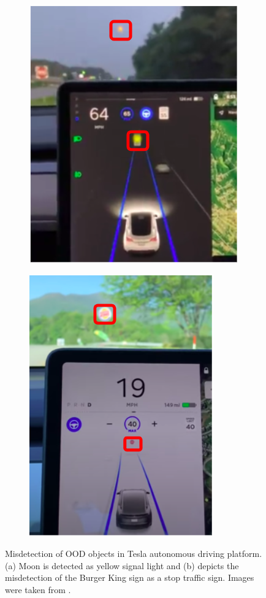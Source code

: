 \begin{figure}[h!]
    \begin{subfigure}{0.48\textwidth}
        \centering
        \includegraphics[scale=0.5]{images/tesla_1.png}
        \caption{}
        \label{fig:teslafails_1}
    \end{subfigure}
    \begin{subfigure}{0.48\textwidth}
        \centering
        \includegraphics[scale=0.5]{images/tesla_2.png}
        \caption{}
        \label{fig:teslafails_2}
    \end{subfigure}
    \caption{Misdetection of OOD objects in Tesla autonomous driving platform. (a) Moon is detected as yellow signal light and (b) depicts the misdetection of the Burger King sign as a stop traffic sign. Images were taken from \cite{tesla_fails}.}
\end{figure}


